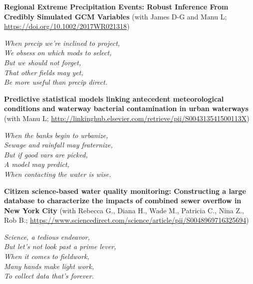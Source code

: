 \documentclass{article}
\begin{document}
\newpage

\noindent
\textbf{Regional Extreme Precipitation Events: Robust Inference From Credibly Simulated GCM Variables} (with James D-G and Manu L; \url{https://doi.org/10.1002/2017WR021318})\\

\vspace{0.25cm}

{\large
\noindent
\textit{When precip we're inclined to project,\\
We obsess on which mods to select,\\
\null \hspace{0.5cm} But we should not forget,\\
\null \hspace{0.5cm} That other fields may yet,\\
Be more useful than precip direct.}
}

\vspace{0.75cm}


\noindent
\textbf{Predictive statistical models linking antecedent meteorological conditions and waterway bacterial contamination in urban waterways} (with Manu L; \url{http://linkinghub.elsevier.com/retrieve/pii/S004313541500113X})\\

\vspace{0.25cm}

{\large
\noindent
\textit{When the banks begin to urbanize,\\
Sewage and rainfall may fraternize,\\
\null \hspace{0.5cm} But if good vars are picked,\\
\null \hspace{0.5cm} A model may predict,\\
When contacting the water is wise.}
}

\vspace{0.75cm}

\noindent
\textbf{Citizen science-based water quality monitoring: Constructing a large database to characterize the impacts of combined sewer overflow in New York City} (with Rebecca G., Diana H., Wade M., Patricia C., Nina Z., Rob B.; \url{https://www.sciencedirect.com/science/article/pii/S0048969716325694})\\

\vspace{0.25cm}

{\large
\noindent
\textit{Science, a tedious endeavor,\\
But let’s not look past a prime lever,\\
\null \hspace{0.5cm} When it comes to fieldwork,\\
\null \hspace{0.5cm} Many hands make light work,\\
To collect data that’s forever.}
}
\end{document}
